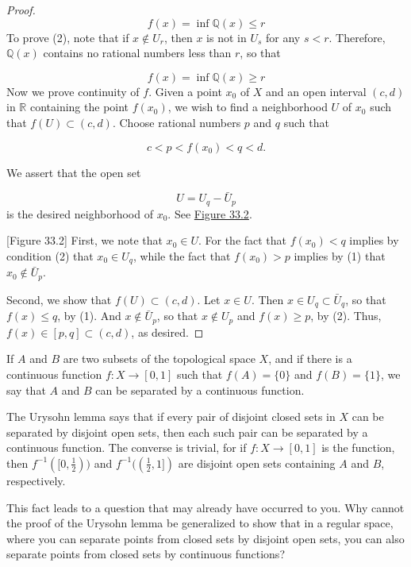\begin{proof}
\[
f(x) = \inf \mathbb{Q}(x) \leq r
\]
To prove (2), note that if \(x \notin {U}_{r}\), then \(x\) is not in \(U_{s}\) for any \(s < r\). Therefore, \(\mathbb{Q}(x)\) contains no rational numbers less than \(r\), so that

\[
f(x) = \inf \mathbb{Q}(x) \geq r
\]
Now we prove continuity of \(f\). Given a point \(x_{0}\) of \(X\) and an open interval \((c, d)\) in \(\mathbb{R}\) containing the point \(f( x_{0})\), we wish to find a neighborhood \(U\) of \(x_{0}\) such that \(f( U) \subset ( {c,d})\). Choose rational numbers \(p\) and \(q\) such that

\[
c < p < f( x_{0}) < q < d\text{.}
\]

We assert that the open set

\[
U = U_{q} - \bar{U}_{p}
\]
is the desired neighborhood of \(x_{0}\). See \hyperref[fig:33.2]{Figure 33.2}.

[Figure 33.2]
First, we note that \(x_{0} \in U\). For the fact that \(f( x_{0}) < q\) implies by condition (2) that \(x_{0} \in {U}_{q}\), while the fact that \(f( x_{0}) > p\) implies by (1) that \(x_{0} \notin {\bar{U}}_{p}\).

Second, we show that \(f( U) \subset ( {c,d})\). Let \(x \in U\). Then \(x \in {U}_{q} \subset {\bar{U}}_{q}\), so that \(f(x) \leq q\), by (1). And \(x \notin {\bar{U}}_{p}\), so that \(x \notin {U}_{p}\) and \(f(x) \geq p\), by (2). Thus, \(f(x) \in [ {p,q}] \subset ( {c,d})\), as desired.
\end{proof}

\begin{definition}
 If \(A\) and \(B\) are two subsets of the topological space \(X\), and if there is a continuous function \(f : X \rightarrow [ {0,1}]\) such that \(f( A) = \{ 0\}\) and \(f( B) = \{ 1\}\), we say that \(A\) and \(B\) can be separated by a continuous function.
\end{definition}

The Urysohn lemma says that if every pair of disjoint closed sets in \(X\) can be separated by disjoint open sets, then each such pair can be separated by a continuous function. The converse is trivial, for if \(f : X \rightarrow [ {0,1}]\) is the function, then \(f^{-1}( [ 0,\frac{1}{2}) )\) and \(f^{-1}( ( {\frac{1}{2},1}] )\) are disjoint open sets containing \(A\) and \(B\), respectively.

This fact leads to a question that may already have occurred to you. Why cannot the proof of the Urysohn lemma be generalized to show that in a regular space, where you can separate points from closed sets by disjoint open sets, you can also separate points from closed sets by continuous functions?

